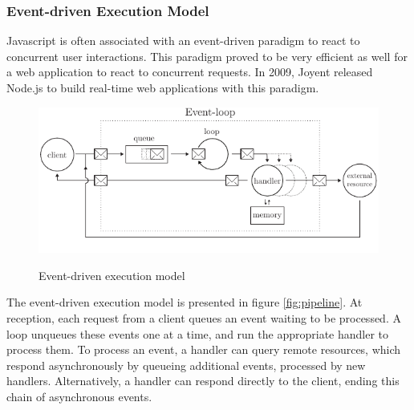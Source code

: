 \subsubsection{Event-driven Execution Model} \label{chapter2:web-as-a-platform:javascript:event-loop}

Javascript is often associated with an event-driven paradigm to react to concurrent user interactions.
This paradigm proved to be very efficient as well for a web application to react to concurrent requests.
In 2009, Joyent released Node.js to build real-time web applications with this paradigm.

\begin{figure}[h!]
  \centering
  \includegraphics[width=0.7\linewidth]{../resources/event-loop.pdf}
  \label{fig:event-loop}
  \caption{Event-driven execution model}
\end{figure}

The event-driven execution model is presented in figure \ref{fig:pipeline}.
At reception, each request from a client queues an event waiting to be processed.
A loop unqueues these events one at a time, and run the appropriate handler to process them.
To process an event, a handler can query remote resources, which respond asynchronously by queueing additional events, processed by new handlers.
Alternatively, a handler can respond directly to the client, ending this chain of asynchronous events.


